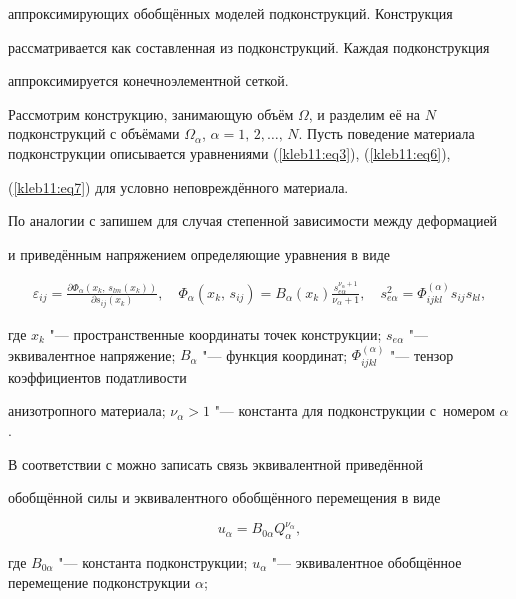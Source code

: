 аппроксимирующих обобщённых моделей подконструкций. Конструкция

рассматривается как составленная из подконструкций. Каждая подконструкция

аппроксимируется конечноэлементной сеткой.



Рассмотрим конструкцию, занимающую объём $\Omega$, и разделим её на $N$ подконструкций с объёмами $\Omega_\alpha $, $\alpha

=1,\,2,\ldots,\,N$. Пусть поведение материала подконструкции описывается уравнениями (\ref{kleb11:eq3}), (\ref{kleb11:eq6}),

(\ref{kleb11:eq7}) для условно неповреждённого материала.



По аналогии с \cite{kleb11:bib2} запишем для случая степенной зависимости между деформацией

и приведённым напряжением определяющие уравнения в виде

\begin{gather*}

\varepsilon_{ij} =\frac{\partial \Phi _\alpha \left(x_k,\,s_{lm}(

x_k) \right)}{\partial s_{ij} (x_k)}, \quad  \Phi_\alpha (x_k,\,s_{ij})=B_\alpha (x_k)

\frac{s_{e\alpha}^{\nu_\alpha +1}}{\nu_\alpha +1}, \quad 

s_{e\alpha}^2 =\Phi_{ijkl}^{(\alpha)} s_{ij} s_{kl},

\end{gather*}

где $x_k$ "--- пространственные координаты точек конструкции; $s_{e\alpha}$ "--- эквивалентное напряжение; $B_\alpha $ "--- функция координат; $\Phi

_{ijkl}^{(\alpha)} $ "--- тензор коэффициентов податливости

анизотропного материала; $\nu_\alpha >1 $ "--- константа для подконструкции с~номером $\alpha$.



В соответствии с \cite{kleb11:bib12,kleb11:bib13} можно записать связь эквивалентной приведённой

обобщённой силы и эквивалентного обобщённого перемещения в виде

\[

u_\alpha = B_{0 \alpha} Q_\alpha^{\nu_\alpha},

\]

где $B_{0 \alpha}$ "--- константа подконструкции; $u_\alpha$ "--- эквивалентное обобщённое перемещение подконструкции $\alpha$;

